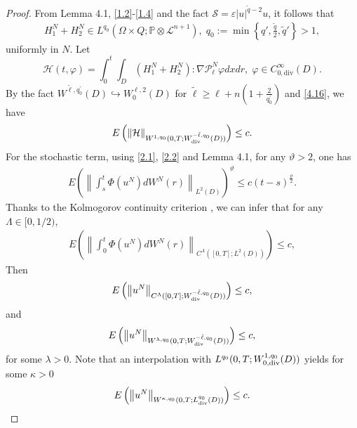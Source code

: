\documentclass[reqno]{amsart}
\theoremstyle{definition}
\theoremstyle{remark}
\numberwithin{equation}{section} \allowdisplaybreaks
\begin{document}
\begin{proof}
From Lemma 4.1, \eqref{1.2}-\eqref{1.4} and the fact
$\mathcal{S}=\varepsilon|u|^{\tilde{q}-2}u$, it follows that
\begin{equation}\label{4.16}
\begin{split}
H_1^N+H_2^N\in L^{q_0}(\Omega\times Q;\mathbb{P}\otimes
\mathcal{L}^{n+1}), \;
q_0:=\min\left\{q',\frac{\tilde{q}}{2},\tilde{q}'\right\}>1,
\end{split}
\end{equation}
uniformly in $N$. Let
$$\mathcal{H}(t,\varphi)=\int_0^t\!\!\!\int_D(H_1^N+H_2^N):\nabla\mathcal{P}_{\ell}^N\varphi dxdr,\; \varphi\in C^\infty_{0,\text{div}}(D).$$
By the fact $W^{\tilde{\ell},q^\prime_0}(D)\hookrightarrow
W_0^{\ell,2}(D)$ for $\tilde{\ell}\geq
\ell+n(1+\frac{2}{q^\prime_0})$ and \eqref{4.16}, we have
$$E\left(\|\mathcal{H}\|_{W^{1,q_0}(0,T;W_{\rm{div}}^{-\tilde{\ell},q_0}(D))}\right)\leq c.$$
For the stochastic term, using \eqref{2.1}, \eqref{2.2} and Lemma
4.1, for any $\vartheta>2$, one has
\begin{equation*}
\begin{split}
E\left(\left\|\int_s^t\Phi(u^N)dW^N(r)\right\|_{L^2(D)}\right)^\vartheta
\leq c(t-s)^{\frac{\vartheta}{2}}.
\end{split}
\end{equation*}
Thanks to the Kolmogorov continuity criterion \cite{GDJZ}, we can
infer that for any $\Lambda\in[0, 1/2)$,
\begin{equation*}
\begin{split}
E\left(\left\|\int_0^t\Phi(u^N)dW^N(r)\right\|_{C^\Lambda([0,T];L^2(D))}\right)
\leq c,
\end{split}
\end{equation*}
 Then
\begin{equation}\label{4.17}
\begin{split}
E\left(\left\|u^N\right\|_{C^\Lambda([0,T];W_{\rm{div}}^{-\tilde{\ell},q_0}(D))}\right)\leq
c,
\end{split}
\end{equation}
and
\begin{equation}\label{4.18}
\begin{split}
E\left(\left\|u^N\right\|_{W^{\lambda,q_0}(0,T;W_{\rm{div}}^{-\tilde{\ell},q_0}(D))}\right)\leq
c,
\end{split}
\end{equation}
for some $\lambda>0$. Note that an interpolation with
$L^{q_0}(0,T;W_{0,\rm{div}}^{1,q_0}(D))$
yields for some $\kappa>0$
\begin{equation}\label{4.19}
\begin{split}
E\left(\left\|u^N\right\|_{W^{\kappa,q_0}(0,T;L_{\rm{div}}^{q_0}(D))}\right)\leq
c.
\end{split}
\end{equation}



\end{proof}
\end{document}
